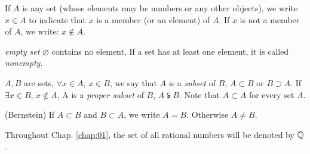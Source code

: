 
\begin{mydef}
    \label{mydef:1.3}
    If $A$ is any set (whose elements may be numbers or any other objects),
    we write $x\in A$ to indicate that $x$ is a member (or an element) of $A$.
    If $x$ is not a member of $A$, we write: $x\notin A$.

    \emph{empty set} $\varnothing$ contains no element, If a set has at least one element, it is called \emph{nonempty}.

    $A,B$ are sets,
    $\forall x\in A$, $x\in B$, we say that $A$ is a \emph{subset} of $B$, $A \subset B$ or $B \supset A$.
    If $\exists x\in B$, $x\notin A$, A is a \emph{proper subset} of $B$, $A \subsetneqq B$.
    Note that $A\subset A$ for every set $A$.

    (Bernstein) If $A\subset B$ and $B\subset A$, we write $A = B$. Otherwise $A \neq B$.
\end{mydef}

\begin{mydef}
    \label{mydef:1.4}
    Throughout Chap. \ref{chap:01}, the set of all rational numbers will be denoted by ${\protect\mathbb Q} $.
\end{mydef}